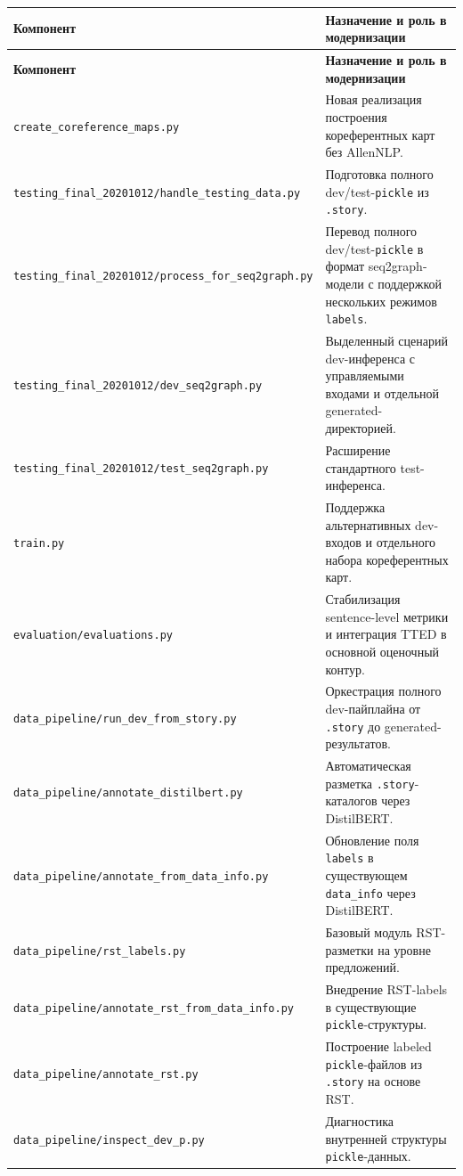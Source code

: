 \documentclass[12pt,a4paper]{article}
\begin{document}
\begin{longtable}{>{\raggedright\arraybackslash}p{} >{\raggedright\arraybackslash}p{}}
\toprule
\textbf{Компонент} & \textbf{Назначение и роль в модернизации} \\
\midrule
\endfirsthead
\toprule
\textbf{Компонент} & \textbf{Назначение и роль в модернизации} \\
\midrule
\endhead
\texttt{create\_coreference\_maps.py} & Новая реализация построения кореферентных карт без AllenNLP. \\
\texttt{testing\_final\_20201012/handle\_testing\_data.py} & Подготовка полного dev/test-\texttt{pickle} из \texttt{.story}. \\
\texttt{testing\_final\_20201012/process\_for\_seq2graph.py} & Перевод полного dev/test-\texttt{pickle} в формат seq2graph-модели с поддержкой нескольких режимов \texttt{labels}. \\
\texttt{testing\_final\_20201012/dev\_seq2graph.py} & Выделенный сценарий dev-инференса с управляемыми входами и отдельной generated-директорией. \\
\texttt{testing\_final\_20201012/test\_seq2graph.py} & Расширение стандартного test-инференса. \\
\texttt{train.py} & Поддержка альтернативных dev-входов и отдельного набора кореферентных карт. \\
\texttt{evaluation/evaluations.py} & Стабилизация sentence-level метрики и интеграция TTED в основной оценочный контур. \\
\texttt{data\_pipeline/run\_dev\_from\_story.py} & Оркестрация полного dev-пайплайна от \texttt{.story} до generated-результатов. \\
\texttt{data\_pipeline/annotate\_distilbert.py} & Автоматическая разметка \texttt{.story}-каталогов через DistilBERT. \\
\texttt{data\_pipeline/annotate\_from\_data\_info.py} & Обновление поля \texttt{labels} в существующем \texttt{data\_info} через DistilBERT. \\
\texttt{data\_pipeline/rst\_labels.py} & Базовый модуль RST-разметки на уровне предложений. \\
\texttt{data\_pipeline/annotate\_rst\_from\_data\_info.py} & Внедрение RST-labels в существующие \texttt{pickle}-структуры. \\
\texttt{data\_pipeline/annotate\_rst.py} & Построение labeled \texttt{pickle}-файлов из \texttt{.story} на основе RST. \\
\texttt{data\_pipeline/inspect\_dev\_p.py} & Диагностика внутренней структуры \texttt{pickle}-данных. \\
\bottomrule
\end{longtable}
\end{document}
